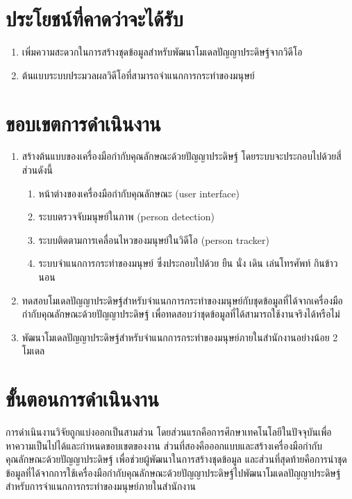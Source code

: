 
\section{ประโยชน์ที่คาดว่าจะได้รับ}
\begin{enumerate}
	\setlength\itemsep{-0.25em}
	\item เพิ่มความสะดวกในการสร้างชุดข้อมูลสำหรับพัฒนาโมเดลปัญญาประดิษฐ์จากวิดีโอ
	\item ต้นแบบระบบประมวลผลวิดีโอที่สามารถจำแนกการกระทำของมนุษย์
\end{enumerate}
\clearpage

\section{ขอบเขตการดำเนินงาน}
\begin{enumerate}
	\setlength\itemsep{-0.25em}
	\item สร้างต้นแบบของเครื่องมือกำกับคุณลักษณะด้วยปัญญาประดิษฐ์ โดยระบบจะประกอบไปด้วยสี่ส่วนดังนี้
	\begin{enumerate}
		\setlength\itemsep{-0.25em}
		\item หน้าต่างของเครื่องมือกำกับคุณลักษณะ (user interface)
		\item ระบบตรวจจับมนุษย์ในภาพ (person detection)
		\item ระบบติดตามการเคลื่อนไหวของมนุษย์ในวิดีโอ (person tracker)
		\item ระบบจำแนกการกระทำของมนุษย์ ซึ่งประกอบไปด้วย ยืน นั่ง เดิน เล่นโทรศัพท์ กินข้าว นอน
	\end{enumerate}
	\item ทดสอบโมเดลปัญญาประดิษฐ์สำหรับจำแนกการกระทำของมนุษย์กับชุดข้อมูลที่ได้จากเครื่องมือกำกับคุณลักษณะด้วยปัญญาประดิษฐ์ เพื่อทดสอบว่าชุดข้อมูลที่ได้สามารถใช้งานจริงได้หรือไม่
	\item พัฒนาโมเดลปัญญาประดิษฐ์สำหรับจำแนกการกระทำของมนุษย์ภายในสำนักงานอย่างน้อย 2 โมเดล
\end{enumerate}

\section{ขั้นตอนการดำเนินงาน}
การดำเนินงานวิจัยถูกแบ่งออกเป็นสามส่วน โดยส่วนแรกคือการศึกษาเทคโนโลยีในปัจจุบันเพื่อหาความเป็นไปได้และกำหนดขอบเขตของงาน 
ส่วนที่สองคือออกแบบและสร้างเครื่องมือกำกับคุณลักษณะด้วยปัญญาประดิษฐ์ เพื่อช่วยผู้พัฒนาในการสร้างชุดข้อมูล 
และส่วนที่สุดท้ายคือการนำชุดข้อมูลที่ได้จากการใช้เครื่องมือกำกับคุณลักษณะด้วยปัญญาประดิษฐ์ไปพัฒนาโมเดลปัญญาประดิษฐ์สำหรับการจำแนกการกระทำของมนุษย์ภายในสำนักงาน
